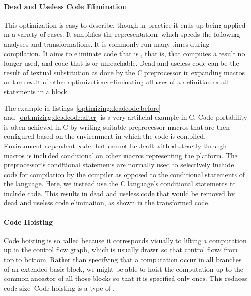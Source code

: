 \paragraph{Dead and Useless Code Elimination}
This optimization is easy to describe, though in practice it ends up being applied in a variety of cases. It simplifies the representation, which speeds the following analyses and transformations. It is commonly run many times during compilation. It aims to eliminate code that is , that is, that computes a result no longer used, and code that is  or unreachable. Dead and useless code can be the result of textual substitution as done by the C preprocessor in expanding macros or the result of other optimizations eliminating all uses of a definition or all statements in a block.

The example in listings~\ref{optimizing:deadcode:before} and~\ref{optimizing:deadcode:after} is a very artificial example in C. Code portability is often achieved in C by writing suitable preprocessor macros that are then configured based on the environment in which the code is compiled. Environment-dependent code that cannot be dealt with abstractly through macros is included conditional on other macros representing the platform. The preprocessor's conditional statements are normally used to selectively include code for compilation by the compiler as opposed to the conditional statements of the language. Here, we instead use the C language's conditional statements to include code. This results in dead and useless code that would be removed by dead and useless code elimination, as shown in the transformed code.





\paragraph{Code Hoisting}
Code hoisting is so called because it corresponds visually to lifting a computation up in the control flow graph, which is usually drawn so that control flows from top to bottom. Rather than specifying that a computation occur in all branches of an extended basic block, we might be able to hoist the computation up to the common ancestor of all those blocks so that it is specified only once. This reduces code size. Code hoisting is a type of .

